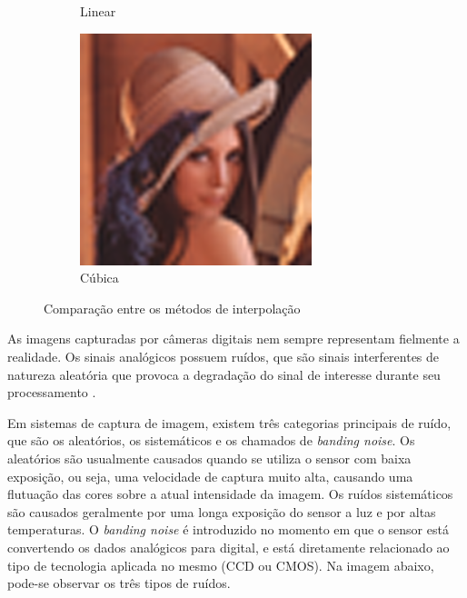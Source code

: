 \begin{figure}
\begin{subfigure}[b]{0.475\textwidth}
            \caption[]%
            {{\small Linear}}    
            \label{fig:intc}
        \end{subfigure}
        \quad
        \begin{subfigure}[b]{0.475\textwidth}   
            \centering 
            \includegraphics[width=\textwidth]{Figures/resCubic.png}
            \caption[]%
            {{\small Cúbica}}    
            \label{fig:intd}
        \end{subfigure}
        \caption[ The average and standard deviation of critical parameters ]
        {\small Comparação entre os métodos de interpolação} 
        \label{fig:scale}
    \end{figure}
		
		As imagens capturadas por câmeras digitais nem sempre representam fielmente a realidade. Os sinais analógicos possuem ruídos, que são sinais interferentes de natureza aleatória que provoca a degradação do sinal de interesse durante seu processamento \cite{fabris}.
		
		Em sistemas de captura de imagem, existem três categorias principais de ruído, que são os aleatórios, os sistemáticos e os chamados de \textit{banding noise}. Os aleatórios são usualmente causados quando se utiliza o sensor com baixa exposição, ou seja, uma velocidade de captura muito alta, causando uma flutuação das cores sobre a atual intensidade da imagem. Os ruídos sistemáticos são causados geralmente por uma longa exposição do sensor a luz e por altas temperaturas. O \textit{banding noise} é introduzido no momento em que o sensor está convertendo os dados analógicos para digital, e está diretamente relacionado ao tipo de tecnologia aplicada no mesmo (CCD ou CMOS). Na imagem abaixo, pode-se observar os três tipos de ruídos.
	
